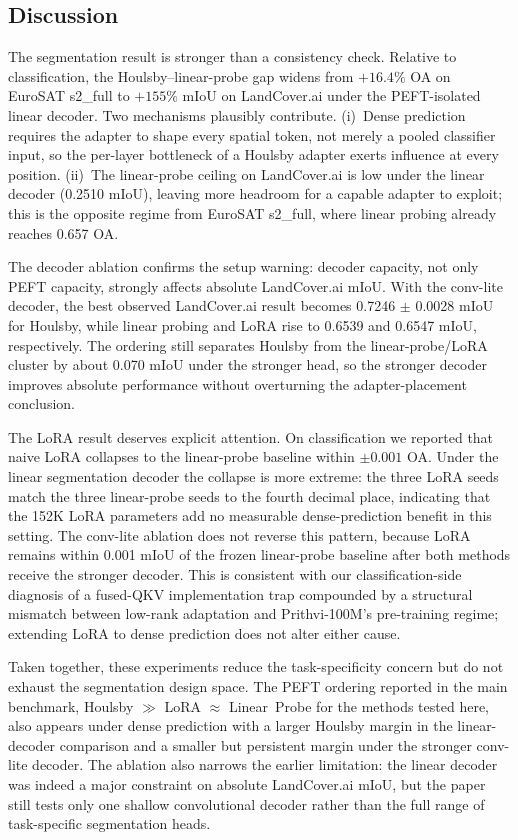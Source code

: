 \subsection{Discussion}

The segmentation result is stronger than a consistency check. Relative to classification, the Houlsby--linear-probe gap widens from $+16.4\%$ OA on EuroSAT s2\_full to $+155\%$ mIoU on LandCover.ai under the PEFT-isolated linear decoder. Two mechanisms plausibly contribute. (i)~Dense prediction requires the adapter to shape every spatial token, not merely a pooled classifier input, so the per-layer bottleneck of a Houlsby adapter exerts influence at every position. (ii)~The linear-probe ceiling on LandCover.ai is low under the linear decoder (0.2510 mIoU), leaving more headroom for a capable adapter to exploit; this is the opposite regime from EuroSAT s2\_full, where linear probing already reaches 0.657 OA.

The decoder ablation confirms the setup warning: decoder capacity, not only PEFT capacity, strongly affects absolute LandCover.ai mIoU. With the conv-lite decoder, the best observed LandCover.ai result becomes 0.7246 $\pm$ 0.0028 mIoU for Houlsby, while linear probing and LoRA rise to 0.6539 and 0.6547 mIoU, respectively. The ordering still separates Houlsby from the linear-probe/LoRA cluster by about 0.070 mIoU under the stronger head, so the stronger decoder improves absolute performance without overturning the adapter-placement conclusion.

The LoRA result deserves explicit attention. On classification we reported that naive LoRA collapses to the linear-probe baseline within $\pm 0.001$ OA. Under the linear segmentation decoder the collapse is more extreme: the three LoRA seeds match the three linear-probe seeds to the fourth decimal place, indicating that the 152K LoRA parameters add no measurable dense-prediction benefit in this setting. The conv-lite ablation does not reverse this pattern, because LoRA remains within 0.001 mIoU of the frozen linear-probe baseline after both methods receive the stronger decoder. This is consistent with our classification-side diagnosis of a fused-QKV implementation trap compounded by a structural mismatch between low-rank adaptation and Prithvi-100M's pre-training regime; extending LoRA to dense prediction does not alter either cause.

Taken together, these experiments reduce the task-specificity concern but do not exhaust the segmentation design space. The PEFT ordering reported in the main benchmark, Houlsby $\gg$ LoRA $\approx$ Linear~Probe for the methods tested here, also appears under dense prediction with a larger Houlsby margin in the linear-decoder comparison and a smaller but persistent margin under the stronger conv-lite decoder. The ablation also narrows the earlier limitation: the linear decoder was indeed a major constraint on absolute LandCover.ai mIoU, but the paper still tests only one shallow convolutional decoder rather than the full range of task-specific segmentation heads.
